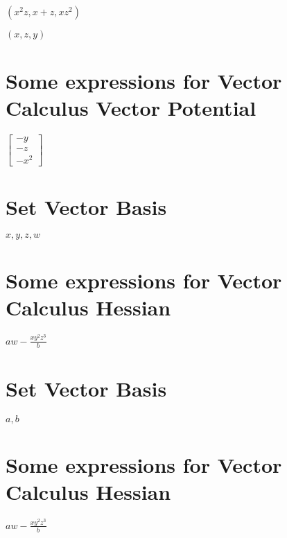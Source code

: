 \documentclass{article}
\begin{document}
$(x^{2}z,x+z,xz^{2})$

$(x,z,y)$

\section{Some expressions for Vector Calculus Vector Potential}

$\left[ 
\begin{array}{c}
-y \\ 
-z \\ 
-x^{2}%
\end{array}%
\right] $

\section{Set Vector Basis}

$x,y,z,w$

\section{Some expressions for Vector Calculus Hessian}

$aw-\frac{xy^{2}z^{3}}{b}$

\section{Set Vector Basis}

$a,b$

\section{Some expressions for Vector Calculus Hessian}

$aw-\frac{xy^{2}z^{3}}{b}$
\end{document}
